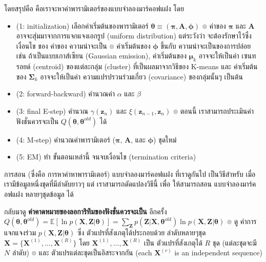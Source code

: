 โดยสรุปคือ คือเราจะหาค่าพารามิเตอร์ของแบบจำลองมาร์คอฟแฝง โดย 
\begin{itemize}
\item (1: initialization) เลือกค่าเริ่มต้นของพารามิเตอร์ $\bm{\theta} \equiv (\bm{\pi}, \textbf{A}, \bm{\phi})$
๏ ค่าของ $\bm{\pi}$ และ $\textbf{A}$ อาจจะสุ่มมาจากการแจกแจงเอกรูป (uniform distribution) แต่ระวังว่า จะต้องรักษาไว้ซึ่ง เงื่อนไข ของ ค่าของ ความน่าจะเป็น
๏ ค่าเริ่มต้นของ $\bm{\phi}$ ขึ้นกับ ความน่าจะเป็นของการปล่อย เช่น 
ถ้าเป็นแบบเกาส์เซียน (Gaussian emission),
ค่าเริ่มต้นของ $\bm{\mu}_k$ อาจจะให้เป็นค่า 	เซนทรอยด์ (centroid) ของแต่ละกลุ่ม (cluster) ที่เป็นผลมาจากวิธีของ K-means
และ ค่าเริ่มต้นของ $\bm{\Sigma}_k$ อาจจะให้เป็นค่า ความแปรปรวนร่วมเกี่ยว (covariance) ของกลุ่มนั้นๆ เป็นต้น

\item (2: forward-backward) คำนวณค่า $\alpha$ และ $\beta$

\item (3: final E-step) คำนวณ $\gamma(\textbf{z}_n)$ และ $\xi(\textbf{z}_{n-1}, \textbf{z}_n)$
๏ ตอนนี้ เราสามารถประเมินค่า ฟังชั่นควรจะเป็น $Q(\bm{\theta}, \bm{\theta}^{old})$ ได้

\item (4: M-step) คำนวณค่าพารามิเตอร์ ($\bm{\pi}$, $\textbf{A}$, และ $\bm{\phi}$) ชุดใหม่

\item (5: EM) ทำ ขั้นตอนเหล่านี้ จนจบเงื่อนไข (termination criteria)

\end{itemize}


การสอน (ซึ่งคือ การหาค่าหาพารามิเตอร์) แบบจำลองมาร์คอฟแฝง ที่เราดูกันไป เป็นวิธีสำหรับ เมื่อเรามีข้อมูลหนึ่งชุดที่มีลำดับยาวๆ แต่ เราสามารถดัดแปลงวิธีนี้ เพื่อ ให้สามารถสอน แบบจำลองมาร์คอฟแฝง หลายๆชุดข้อมูล ได้

กลับมาดู \textbf{ค่าคาดหมายของลอการิทึมของฟังชั่นควรจะเป็น} อีกครั้ง
$Q(\bm{\theta}, \bm{\theta}^{old}) = \mathbb{E} [\ln p(\textbf{X}, \textbf{Z}|\bm{\theta})]
 = \sum_{\textbf{Z}} p(\textbf{Z}|\textbf{X}, \bm{\theta}^{old}) \ln p (\textbf{X}, \textbf{Z} | \bm{\theta})$
๏ ดู ค่าการแจกแจงร่วม $p(\textbf{X}, \textbf{Z}|\bm{\theta})$ ซึ่ง ตัวแปรที่สังเกตุได้ประกอบด้วย ลำดับหลายๆชุด $\textbf{X} = \{ \textbf{X}^{(1)}, \ldots, \textbf{X}^{(R)} \}$ โดย $\textbf{X}^{(1)}, \ldots, \textbf{X}^{(R)}$ เป็น ตัวแปรที่สังเกตุได้ $R$ ชุด (แต่ละชุดจะมี $N$ ลำดับ)
๏ และ ตัวแปรแต่ละชุดเป็นอิสระจากกัน (each $\textbf{X}^{(r)}$ is an independent sequence)

